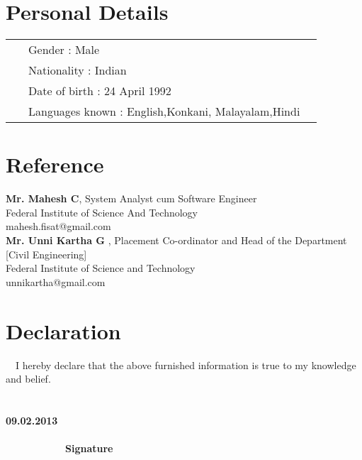 \documentclass[a4paper]{article}
\begin{document}
\section{Personal Details}
\begin{flushleft}
\begin{tabular}{ll}
\indent \ \ \ Gender :  Male \\
\indent  \ \ \   Nationality : Indian\\
\indent   \ \  \ Date of birth : 24 April 1992 \\
\indent \ \ \   Languages known  : English,Konkani, Malayalam,Hindi
\end{tabular}
\end{flushleft}

\section{Reference}

\textbf{Mr. Mahesh C},  System Analyst cum Software Engineer\\
\indent  Federal Institute of  Science And Technology \\
\indent mahesh.fisat@gmail.com \\

\textbf{Mr. Unni Kartha G} , Placement Co-ordinator  and Head of the Department [Civil Engineering] \\ 
\indent Federal Institute of Science and Technology\\ 
\indent unnikartha@gmail.com 

\section{Declaration}
\indent \ \ I hereby declare that the above furnished information is true to my knowledge and belief. \\ \\ \\
\vspace{5\baselineskip}
\indent \textbf {09.02.2013} \indent \ \ \ \ \ \ \ \ \ \ \ \ \ \ \ \ \ \ \ \ \ \ \ \ \ \ \ \ \ \ \ \ \ \ \ \ \ \ \ \ \ \ \ \ \ \ \ \ \ \ \ \ \ \ \ \ \ \ \ \ \ \ \ \ \ \ \ \ \ \ \ \ \ \ \ \ \ \ \ \ \ \ \ \ \textbf{Signature}
\end{document}
